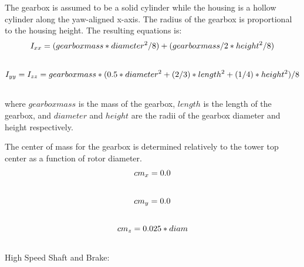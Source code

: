 \documentclass[letterpaper,10pt,openany,oneside]{sphinxmanual}
\begin{document}
The gearbox is assumed to be a solid cylinder while the housing is a hollow cylinder along the yaw-aligned x-axis.  The radius of the gearbox is proportional to the housing height.  The resulting equations is:
\begin{gather}
\begin{split}I_{xx}=(gearboxmass * diameter^2 / 8)+ (gearboxmass/2 * height^2 / 8)\end{split}\notag\\\begin{split}\end{split}\notag
\end{gather}\begin{gather}
\begin{split}I_{yy}=I_{zz}= gearboxmass * (0.5 * diameter^2 + (2/3) * length^2 + (1/4) * height^2) / 8\end{split}\notag\\\begin{split}\end{split}\notag
\end{gather}
where $gearboxmass$ is the mass of the gearbox, $length$ is the length of the gearbox, and $diameter$ and $height$ are the radii of the gearbox diameter and height respectively.

The center of mass for the gearbox is determined relatively to the tower top center as a function of rotor diameter.
\begin{gather}
\begin{split}cm_{x} = 0.0\end{split}\notag\\\begin{split}\end{split}\notag
\end{gather}\begin{gather}
\begin{split}cm_{y} = 0.0\end{split}\notag\\\begin{split}\end{split}\notag
\end{gather}\begin{gather}
\begin{split}cm_{z} = 0.025 * diam\end{split}\notag\\\begin{split}\end{split}\notag
\end{gather}
High Speed Shaft and Brake:
\end{document}
